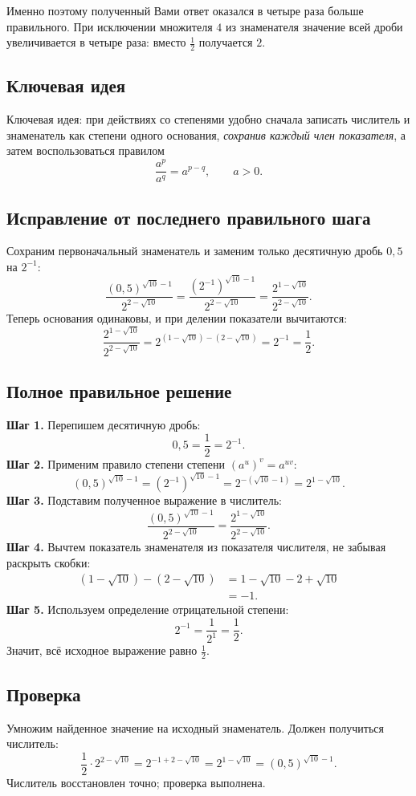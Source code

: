 \documentclass[11pt,a4paper]{article}
\begin{document}
Именно поэтому полученный Вами ответ оказался в четыре раза больше
правильного. При исключении множителя $4$ из знаменателя значение всей
дроби увеличивается в четыре раза: вместо $\frac12$ получается $2$.
\subsection*{Ключевая идея}
\textcolor{blue!60!black}{Ключевая идея:} при действиях со степенями
удобно сначала записать числитель и знаменатель как степени одного
основания, \emph{сохранив каждый член показателя}, а затем воспользоваться
правилом
\[
\frac{a^p}{a^q}=a^{p-q},\qquad a>0.
\]
\subsection*{Исправление от последнего правильного шага}
Сохраним первоначальный знаменатель и заменим только десятичную дробь
$0{,}5$ на $2^{-1}$:
\[
\frac{(0{,}5)^{\sqrt{10}-1}}{2^{2-\sqrt{10}}}
=\frac{(2^{-1})^{\sqrt{10}-1}}{2^{2-\sqrt{10}}}
=\frac{2^{1-\sqrt{10}}}{2^{2-\sqrt{10}}}.
\]
Теперь основания одинаковы, и при делении показатели вычитаются:
\[
\frac{2^{1-\sqrt{10}}}{2^{2-\sqrt{10}}}
=2^{(1-\sqrt{10})-(2-\sqrt{10})}
=2^{-1}=\frac12.
\]
\subsection*{Полное правильное решение}
\textbf{Шаг 1.} Перепишем десятичную дробь:
\[
0{,}5=\frac12=2^{-1}.
\]
\textbf{Шаг 2.} Применим правило степени степени
$(a^u)^v=a^{uv}$:
\[
(0{,}5)^{\sqrt{10}-1}
=(2^{-1})^{\sqrt{10}-1}
=2^{-(\sqrt{10}-1)}
=2^{1-\sqrt{10}}.
\]
\textbf{Шаг 3.} Подставим полученное выражение в числитель:
\[
\frac{(0{,}5)^{\sqrt{10}-1}}{2^{2-\sqrt{10}}}
=\frac{2^{1-\sqrt{10}}}{2^{2-\sqrt{10}}}.
\]
\textbf{Шаг 4.} Вычтем показатель знаменателя из показателя
числителя, не забывая раскрыть скобки:
\begin{align*}
(1-\sqrt{10})-(2-\sqrt{10})
 &=1-\sqrt{10}-2+\sqrt{10}\\
 &=-1.
\end{align*}
\textbf{Шаг 5.} Используем определение отрицательной степени:
\[
2^{-1}=\frac1{2^1}=\frac12.
\]
Значит, всё исходное выражение равно $\frac12$.
\subsection*{Проверка}
Умножим найденное значение на исходный знаменатель.
Должен получиться числитель:
\[
\frac12\cdot 2^{2-\sqrt{10}}
=2^{-1+2-\sqrt{10}}
=2^{1-\sqrt{10}}
=(0{,}5)^{\sqrt{10}-1}.
\]
Числитель восстановлен точно; проверка выполнена.
\end{document}

